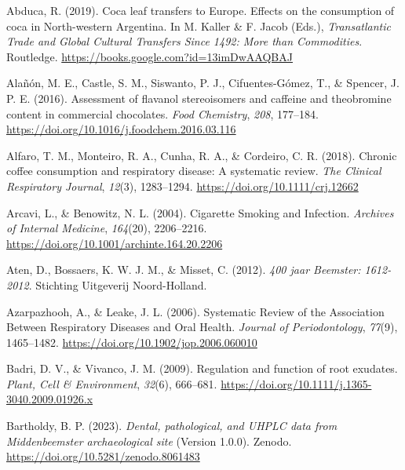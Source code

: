 \documentclass[
]{article}
\newlength{\cslhangindent}
\newenvironment{CSLReferences}[2] %
 {\begin{list}{}{%
  \setlength{\itemindent}{0pt}
  \setlength{\leftmargin}{0pt}
  \setlength{\parsep}{0pt}
  \ifodd #1
   \setlength{\leftmargin}{\cslhangindent}
   \setlength{\itemindent}{-1\cslhangindent}
  \fi
  \setlength{\itemsep}{#2\baselineskip}}}
 {\end{list}}
\begin{document}
\label{refs}
\begin{CSLReferences}{1}{0}
Abduca, R. (2019). Coca leaf transfers to {Europe}. {Effects} on the
consumption of coca in {North-western Argentina}. In M. Kaller \& F.
Jacob (Eds.), \emph{Transatlantic {Trade} and {Global Cultural Transfers
Since} 1492: {More} than {Commodities}}. {Routledge}.
\url{https://books.google.com?id=13imDwAAQBAJ}

Alañón, M. E., Castle, S. M., Siswanto, P. J., Cifuentes-Gómez, T., \&
Spencer, J. P. E. (2016). Assessment of flavanol stereoisomers and
caffeine and theobromine content in commercial chocolates. \emph{Food
Chemistry}, \emph{208}, 177--184.
\url{https://doi.org/10.1016/j.foodchem.2016.03.116}

Alfaro, T. M., Monteiro, R. A., Cunha, R. A., \& Cordeiro, C. R. (2018).
Chronic coffee consumption and respiratory disease: {A} systematic
review. \emph{The Clinical Respiratory Journal}, \emph{12}(3),
1283--1294. \url{https://doi.org/10.1111/crj.12662}

Arcavi, L., \& Benowitz, N. L. (2004). Cigarette {Smoking} and
{Infection}. \emph{Archives of Internal Medicine}, \emph{164}(20),
2206--2216. \url{https://doi.org/10.1001/archinte.164.20.2206}

Aten, D., Bossaers, K. W. J. M., \& Misset, C. (2012). \emph{400 jaar
Beemster: 1612-2012}. {Stichting Uitgeverij Noord-Holland}.

Azarpazhooh, A., \& Leake, J. L. (2006). Systematic {Review} of the
{Association Between Respiratory Diseases} and {Oral Health}.
\emph{Journal of Periodontology}, \emph{77}(9), 1465--1482.
\url{https://doi.org/10.1902/jop.2006.060010}

Badri, D. V., \& Vivanco, J. M. (2009). Regulation and function of root
exudates. \emph{Plant, Cell \& Environment}, \emph{32}(6), 666--681.
\url{https://doi.org/10.1111/j.1365-3040.2009.01926.x}

Bartholdy, B. P. (2023). \emph{Dental, pathological, and {UHPLC} data
from {Middenbeemster} archaeological site} (Version 1.0.0). {Zenodo}.
\url{https://doi.org/10.5281/zenodo.8061483}


\end{CSLReferences}
\end{document}
